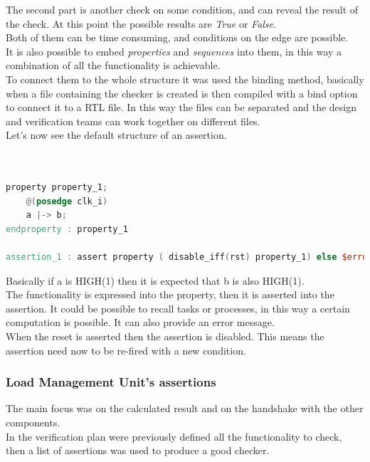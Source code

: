 The second part is another check on some condition, and can reveal the result of the check. At this point the possible results are \textit{True} or \textit{False}.\\

Both of them can be time consuming, and conditions on the edge are possible.\\
It is also possible to embed \textit{properties} and \textit{sequences} into them, in this way  a combination of all the functionality is achievable.\\

To connect them to the whole structure it was used the binding method, basically when a file containing the checker is created is then compiled with a bind option to connect it to a RTL file. In this way the files can be separated and the design and verification teams can work together on different files.\\

Let's now see the default structure of an assertion.
\bigskip

\begin{lstlisting}[language=Verilog,style=verilog-style]


property property_1;
    @(posedge clk_i)
	a |-> b;
endproperty : property_1

assertion_1 : assert property ( disable_iff(rst) property_1) else $error("")

\end{lstlisting}
\bigskip

Basically if a is HIGH(1) then it is expected that b is also HIGH(1).\\

The functionality is expressed into the property, then it is asserted into the assertion. It could be possible to recall tasks or processes, in this way a certain computation is possible.
It can also provide an error message.\\
When the reset is asserted then the assertion is disabled. This means the assertion need now to be re-fired with a new condition.\\

\subsubsection{Load Management Unit's assertions}
The main focus was on the calculated result and on the handshake with the other components.\\

In the verification plan were previously defined all the functionality to check, then a list of assertions was used to produce a good checker.\\

